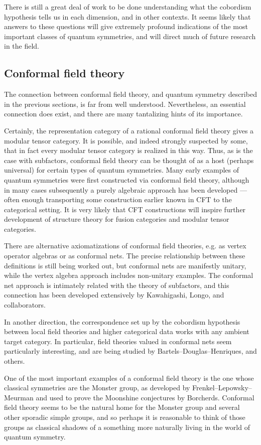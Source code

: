 \documentclass[12pt]{article}
\begin{document}
There is still a great deal of work to be done understanding what the cobordism hypothesis tells us in each dimension, and in other contexts. It seems likely that answers to these questions will give extremely profound indications of the most important classes of quantum symmetries, and will direct much of future research in the field.

\subsection{Conformal field theory}
The connection between conformal field theory, and quantum symmetry described in the previous sections, is far from well understood. Nevertheless, an essential connection does exist, and there are many tantalizing hints of its importance.

Certainly, the representation category of a rational conformal field theory gives a modular tensor category. It is possible, and indeed strongly suspected by some, that in fact every modular tensor category is realized in this way. Thus, as is the case with subfactors, conformal field theory can be thought of as a host (perhaps universal) for certain types of quantum symmetries. Many early examples of quantum symmetries were first constructed via conformal field theory, although in many cases subsequently a purely algebraic approach has been developed --- often enough transporting some construction earlier known in CFT to the categorical setting. It is very likely that CFT constructions will inspire further development of structure theory for fusion categories and modular tensor categories.

There are alternative axiomatizations of conformal field theories, e.g.  as vertex operator algebras or as conformal nets. The precise relationship between these definitions is still being worked out, but conformal nets are manifestly unitary, while the vertex algebra approach includes non-unitary examples. The conformal net approach is intimately related with the theory of subfactors, and this connection has been developed extensively by Kawahigashi, Longo, and collaborators.

In another direction, the correspondence set up by the cobordism hypothesis between local field theories and higher categorical data works with any ambient target category. In particular, field theories valued in conformal nets seem particularly interesting, and are being studied by Bartels--Douglas--Henriques, and others.

One of the most important examples of a conformal field theory is the one whose classical symmetries are the Monster group, as developed by Frenkel--Lepowsky--Meurman and used to prove the Moonshine conjectures by Borcherds. Conformal field theory seems to be the natural home for the Monster group and several other sporadic simple groups, and so perhaps it is reasonable to think of those groups as classical  shadows of a something more naturally living in the world of quantum symmetry.
\end{document}
